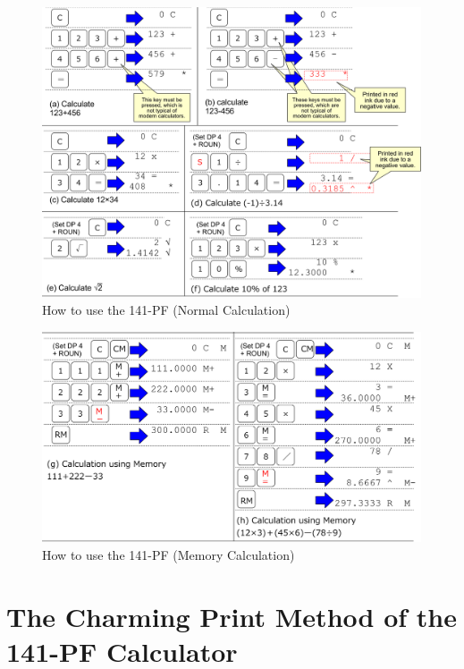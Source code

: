 \begin{figure}[htbp]
  \includegraphics[width=1.0\textwidth]{./Figure/USAGE141PFCALC.png}
  \caption{How to use the 141-PF (Normal Calculation)}
  \label{fig:USAGE141PFCALC}
\end{figure}
\begin{figure}[htbp]
  \includegraphics[width=1.0\textwidth]{./Figure/USAGE141PFMEM.png}
  \caption{How to use the 141-PF (Memory Calculation)}
  \label{fig:USAGE141PFMEM}
\end{figure}

\section{The Charming Print Method of the 141-PF Calculator}

